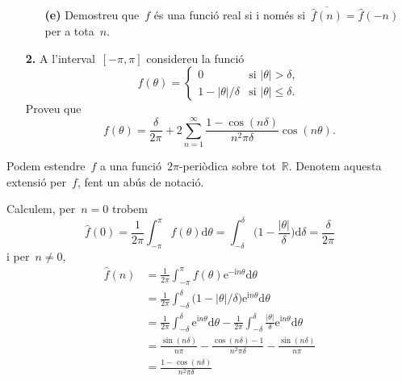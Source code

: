 \documentclass[a4paper]{article}
\newcommand{\iu}{\mathrm{i}}
\newcommand{\e}{\mathrm{e}}
\newcommand{\uppi}{\pi}
\newcommand{\diff}{\mathrm{d}}
\newcommand{\abs}[1]{\lvert{#1}\rvert}
\newcommand{\conjugat}[1]{\overline{#1}}
\begin{document}
\begin{enumerate}
    \item[]\begin{enumerate}
        \item[\textbf{(e)}] Demostreu que~\(f\) és una funció real si i només
            si~\(\conjugat{\widehat{f}(n)} = \widehat{f}(-n)\) per a tota~\(n\).
    \end{enumerate}
\end{enumerate}

\clearpage
\begin{enumerate}
    \item[\textbf{2.}] A l'interval~\([-\uppi, \uppi]\) considereu la funció
        \[
            f(\theta) =
            \begin{cases}
                0 & \text{si } \abs{\theta} > \delta, \\
                1 - \abs{\theta}/\delta & \text{si } \abs{\theta} \leq \delta.
            \end{cases}
        \]
        Proveu que
        \[
            f(\theta) = \frac{\delta}{2\uppi}
            + 2 \sum_{n = 1}^{\infty}
            \frac{1-\cos(n\delta)}{n^{2}\uppi\delta} \cos(n\theta).
        \]
\end{enumerate}
Podem estendre~\(f\) a una funció~\(2\uppi\)-periòdica sobre
tot~\(\mathbb{R}\).
Denotem aquesta extensió per~\(f\), fent un abús de notació.

Calculem, per~\(n = 0\) trobem
\[
    \widehat{f}(0) = \frac{1}{2\uppi}
                     \int_{-\uppi}^{\uppi}f(\theta)\diff\theta
                   = \int_{-\delta}^{\delta}
                     \biggl(1 - \frac{\abs{\theta}}{\delta}\biggr)
                     \diff\delta
                   = \frac{\delta}{2\uppi}
\]
i per~\(n \neq 0\),
\begin{align*}
    \widehat{f}(n) &= \frac{1}{2\uppi} \int_{-\uppi}^{\uppi}
                      f(\theta) \e^{-\iu n\theta}
                      \diff \theta \\
                   &= \frac{1}{2\uppi} \int_{-\delta}^{\delta}
                      \bigl(1 - \abs{\theta}/\delta\bigr)
                      \e^{\iu n\theta}
                      \diff \theta \\
                   &= \frac{1}{2\uppi} \int_{-\delta}^{\delta}
                      \e^{\iu n\theta}
                      \diff \theta
                      - \frac{1}{2\uppi} \int_{-\delta}^{\delta}
                      \frac{\abs{\theta}}{\delta} \e^{\iu n\theta}
                      \diff \theta \\
                   &= \frac{\sin(n\delta)}{n\uppi}
                      - \frac{\cos(n\delta) - 1}{n^{2}\uppi\delta}
                      - \frac{\sin(n\delta)}{n\uppi} \\
                   &= \frac{1 - \cos(n\delta)}{n^{2}\uppi\delta}
\end{align*}
\end{document}

